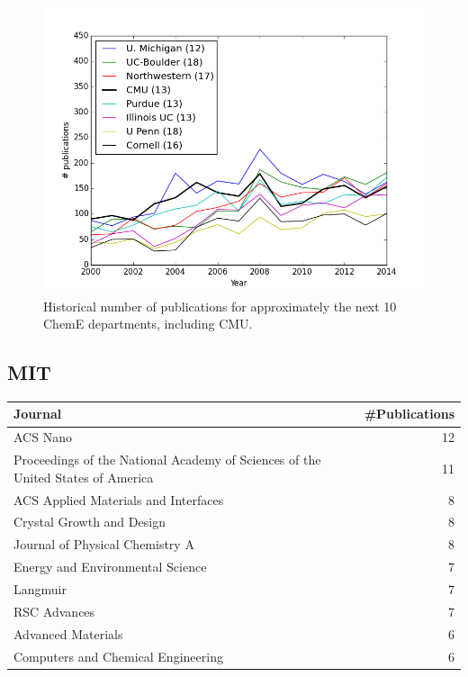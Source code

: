 \documentclass[11pt]{article}
\begin{document}
\begin{figure}[htb]
\centering
\includegraphics[width=.9\linewidth]{./redone-next-10-publications.png}
\caption{Historical number of publications for approximately the next 10 ChemE departments, including CMU. \label{fig-next10}}
\end{figure}

\subsection{MIT}
\label{sec-1-1}
\begin{center}
\begin{tabular}{lr}
Journal & \#Publications\\
\hline
ACS Nano & 12\\
Proceedings of the National Academy of Sciences of the United States of America & 11\\
ACS Applied Materials and Interfaces & 8\\
Crystal Growth and Design & 8\\
Journal of Physical Chemistry A & 8\\
Energy and Environmental Science & 7\\
Langmuir & 7\\
RSC Advances & 7\\
Advanced Materials & 6\\
Computers and Chemical Engineering & 6\\
\end{tabular}
\end{center}
\end{document}
